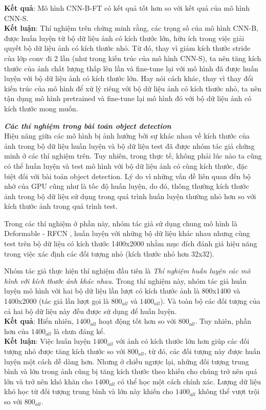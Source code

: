 {    \noindent
    \textbf{Kết quả}:
    Mô hình CNN-B-FT có kết quả tốt hơn so với kết quả của mô hình CNN-S. \\
    \textbf{Kết luận}:
    Thí nghiệm trên chứng minh rằng, các trọng số của mô hình CNN-B, được huấn luyện từ bộ dữ liệu ảnh có kích thước lớn, hữu ích trong việc giải quyết bộ dữ liệu ảnh có kích thước nhỏ.
    Từ đó, thay vì giảm kích thước stride của lớp conv đi 2 lần (như trong kiến trúc của mô hình CNN-S), ta nên tăng kích thước của ảnh chất lượng thấp lên lần và fine-tune lại với mô hình đã được huấn luyện với bộ dữ liệu ảnh có kích thước lớn.
    Hay nói cách khác, thay vì thay đổi kiến trúc của mô hình để xử lý riêng với bộ dữ liệu ảnh có kích thước nhỏ, ta nên tận dụng mô hình pretrained và fine-tune lại mô hình đó với bộ dữ liệu ảnh có kích thước mong muốn.

    \noindent
    \textbf{\textit{Các thí nghiệm trong bài toán object detection}} \\
    Hiệu năng giữa các mô hình bị ảnh hưởng bởi sự khác nhau về kích thước của ảnh trong bộ dữ liệu huấn luyện và bộ dữ liệu test đã được nhóm tác giả chứng minh ở các thí nghiệm trên.
    Tuy nhiên, trong thực tế, không phải lúc nào ta cũng có thể huấn luyện và test mô hình với bộ dữ liệu ảnh có cùng kích thước, đặc biệt đối với bài toán object detection.
    Lý do vì những vấn đề liên quan đến bộ nhớ của GPU cũng như là tốc độ huấn luyện, do đó, thông thường kích thước ảnh trong bộ dữ liệu sử dụng trong quá trình huấn luyện thường nhỏ hơn so với kích thước ảnh trong quá trình test.

    \noindent
    Trong các thí nghiệm ở phần này, nhóm tác giả sử dụng chung mô hình là Deformable - RFCN \cite{dai2017deformable}, huấn luyện với những bộ dữ liệu khác nhau nhưng cùng test trên bộ dữ liệu có kích thước 1400x2000 nhằm mục đích đánh giá hiệu năng trong việc xác định các đối tượng nhỏ (kích thước nhỏ hơn 32x32).

    \noindent
    Nhóm tác giả thực hiện thí nghiệm đầu tiên là \textit{Thí nghiệm huấn luyện các mô hình với kích thước ảnh khác nhau}.
    Trong thí nghiệm này, nhóm tác giả huấn luyện mô hình với hai bộ dữ liệu lần lượt có kích thước ảnh là 800x1400 và 1400x2000 (tác giả lần lượt gọi là ${800}_{all}$ và ${1400}_{all}$).
    Và toàn bộ các đối tượng của cả hai bộ dữ liệu này đều được sử dụng để huấn luyện. \\
    \textbf{Kết quả}:
    Hiển nhiên, ${1400}_{all}$ hoạt động tốt hơn so với ${800}_{all}$.
    Tuy nhiên, phần hơn của ${1400}_{all}$ là chưa đáng kể. \\
    \textbf{Kết luận}:
    Việc huấn luyện ${1400}_{all}$ với ảnh có kích thước lớn hơn giúp các đối tượng nhỏ được tăng kích thước so với ${800}_{all}$, từ đó, các đối tượng này được huấn luyện một cách dễ dàng hơn.
    Nhưng ở chiều ngược lại, những đối tượng trung bình và lớn trong ảnh cũng bị tăng kích thước theo khiến cho chúng trở nên quá lớn và trở nên khó khăn cho ${1400}_{all}$ có thể học một cách chính xác.
    Lượng dữ liệu khó học từ đối tượng trung bình và lớn này khiến cho ${1400}_{all}$ không thể vượt trội so với ${800}_{all}$.

}
